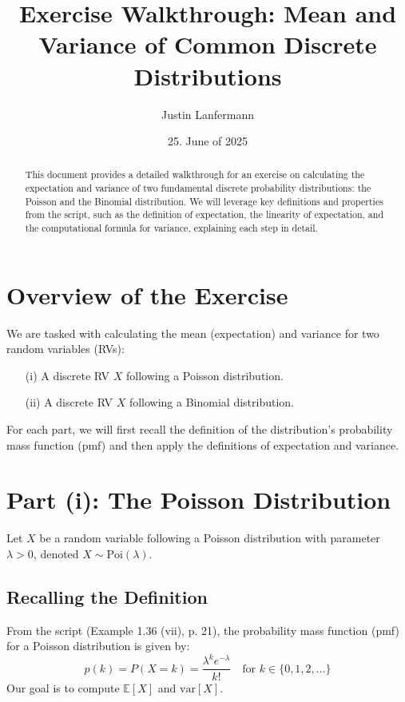 \documentclass[11pt,a4paper]{article}
\title{Exercise Walkthrough: Mean and Variance of Common Discrete Distributions}
\author{Justin Lanfermann}
\date{25. June of 2025}
\theoremstyle{named}
\begin{document}
\maketitle

\begin{abstract}
    This document provides a detailed walkthrough for an exercise on calculating the expectation and variance of two fundamental discrete probability distributions: the Poisson and the Binomial distribution. We will leverage key definitions and properties from the script, such as the definition of expectation, the linearity of expectation, and the computational formula for variance, explaining each step in detail.
\end{abstract}

\section{Overview of the Exercise}
We are tasked with calculating the mean (expectation) and variance for two random variables (RVs):
\begin{enumerate}
    \item[(i)] A discrete RV $X$ following a Poisson distribution.
    \item[(ii)] A discrete RV $X$ following a Binomial distribution.
\end{enumerate}
For each part, we will first recall the definition of the distribution's probability mass function (pmf) and then apply the definitions of expectation and variance.

\section{Part (i): The Poisson Distribution}
Let $X$ be a random variable following a Poisson distribution with parameter $\lambda > 0$, denoted $X \sim \text{Poi}(\lambda)$.

\subsection{Recalling the Definition}
From the script (Example 1.36 (vii), p. 21), the probability mass function (pmf) for a Poisson distribution is given by:
\[
p(k) = P(X=k) = \frac{\lambda^k e^{-\lambda}}{k!} \quad \text{for } k \in \{0, 1, 2, \dots\}
\]
Our goal is to compute $\mathbb{E}[X]$ and $\text{var}[X]$.
\end{document}
